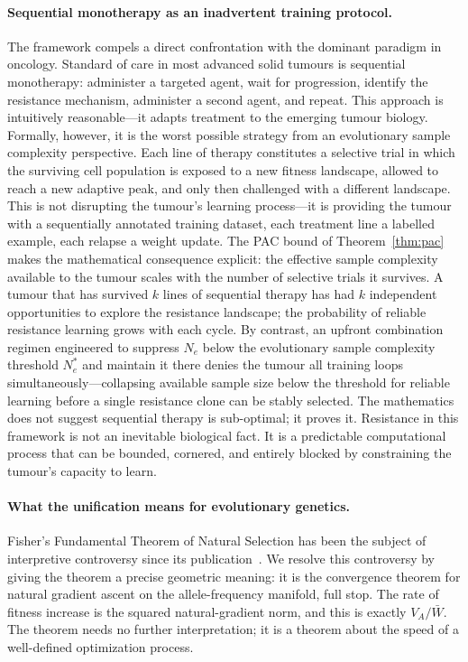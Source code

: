 \documentclass[12pt]{article}
\theoremstyle{remark}
\begin{document}
\paragraph{Sequential monotherapy as an inadvertent training protocol.} The framework compels a direct confrontation with the dominant paradigm in oncology. Standard of care in most advanced solid tumours is sequential monotherapy: administer a targeted agent, wait for progression, identify the resistance mechanism, administer a second agent, and repeat. This approach is intuitively reasonable---it adapts treatment to the emerging tumour biology. Formally, however, it is the worst possible strategy from an evolutionary sample complexity perspective. Each line of therapy constitutes a selective trial in which the surviving cell population is exposed to a new fitness landscape, allowed to reach a new adaptive peak, and only then challenged with a different landscape. This is not disrupting the tumour's learning process---it is providing the tumour with a sequentially annotated training dataset, each treatment line a labelled example, each relapse a weight update. The PAC bound of Theorem~\ref{thm:pac} makes the mathematical consequence explicit: the effective sample complexity available to the tumour scales with the number of selective trials it survives. A tumour that has survived $k$ lines of sequential therapy has had $k$ independent opportunities to explore the resistance landscape; the probability of reliable resistance learning grows with each cycle. By contrast, an upfront combination regimen engineered to suppress $N_e$ below the evolutionary sample complexity threshold $N_e^*$ and maintain it there denies the tumour all training loops simultaneously---collapsing available sample size below the threshold for reliable learning before a single resistance clone can be stably selected. The mathematics does not suggest sequential therapy is sub-optimal; it proves it. Resistance in this framework is not an inevitable biological fact. It is a predictable computational process that can be bounded, cornered, and entirely blocked by constraining the tumour's capacity to learn.

\paragraph{What the unification means for evolutionary genetics.} Fisher's Fundamental Theorem of Natural Selection has been the subject of interpretive controversy since its publication~\cite{ewens1989,lessard1997,price1972,grafen2003}. We resolve this controversy by giving the theorem a precise geometric meaning: it is the convergence theorem for natural gradient ascent on the allele-frequency manifold, full stop. The rate of fitness increase is the squared natural-gradient norm, and this is exactly $V_A/\bar{W}$. The theorem needs no further interpretation; it is a theorem about the speed of a well-defined optimization process.
\end{document}
